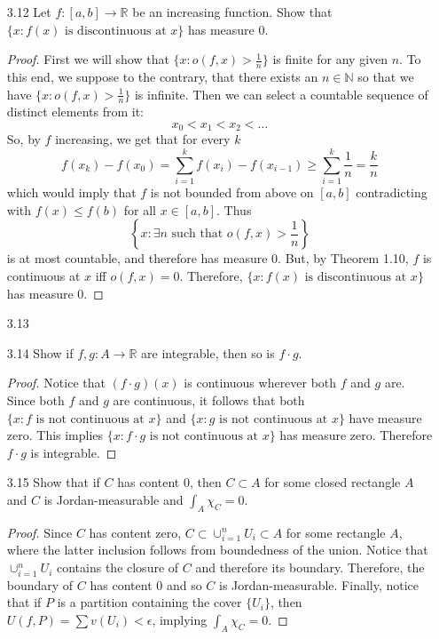 \begin{enumerate}
    \item[3.12] Let \( f:[a,b] \rightarrow \mathbb{R} \) be an increasing function. Show that \( \{x: f(x) \text{ is discontinuous at }x\} \) has measure \( 0 \).
    \begin{proof}
    First we will show that \( \{x: o(f,x) > \frac{1}{n} \} \) is finite for any given \( n \). To this end, we suppose to the contrary, that there exists an \( n \in \mathbb{N} \) so that we have \( \{x: o(f,x) > \frac{1}{n} \} \) is infinite. Then we can select a countable sequence of distinct elements from it: 
    \[
    x_0 < x_1 < x_2 < \ldots
    \]
    So, by \( f \) increasing, we get that for every \( k \)
    \[
    f(x_k)-f(x_0) = \sum_{i=1}^k f(x_i)-f(x_{i-1}) \geq \sum_{i=1}^k \frac{1}{n} = \frac{k}{n}
    \]
    which would imply that \( f \) is not bounded from above on \( [a,b] \) contradicting with \( f(x) \leq f(b) \) for all \( x \in [a,b] \). Thus
    \[
    \left\{ x: \exists n \text{ such that } o(f,x) > \frac{1}{n} \right\}
    \]
    is at most countable, and therefore has measure \( 0 \). But, by Theorem 1.10, \( f \) is continuous at \( x \) iff \( o(f,x) = 0 \). Therefore, \( \{x: f(x) \text{ is discontinuous at }x\} \) has measure \( 0 \).
    \end{proof}
    
    \item[3.13]
    
    \item[3.14] Show if \( f,g:A \rightarrow \mathbb{R} \) are integrable, then so is \( f\cdot g \).
    \begin{proof}
    Notice that \( (f \cdot g)(x) \) is continuous wherever both \( f \) and \( g \) are. Since both \( f \) and \( g \) are continuous, it follows that both \( \{ x: f \text{ is not continuous at } x \} \) and \( \{ x: g \text{ is not continuous at } x \} \) have measure zero. This implies
    \( \{ x: f\cdot g \text{ is not continuous at } x \} \) has measure zero. Therefore \( f \cdot g \) is integrable.
    \end{proof}
    
    \item[3.15] Show that if \( C \) has content \( 0 \), then \( C \subset A \) for some closed rectangle \( A \) and \( C \) is Jordan-measurable and \( \int_A \chi_C = 0 \).
    \begin{proof}
    Since \( C \) has content zero, \( C \subset \cup_{i=1}^n U_i \subset A \) for some rectangle \( A \), where the latter inclusion follows from boundedness of the union. Notice that \( \cup_{i=1}^n U_i \) contains the closure of \( C \) and therefore its boundary. Therefore, the boundary of \( C \) has content \( 0 \) and so \( C \) is Jordan-measurable. Finally, notice that if \( P \) is a partition containing the cover \( \{U_i\} \), then \( U(f,P) = \sum v(U_i) < \epsilon \), implying \( \int_A \chi_C = 0 \).
    \end{proof}
    

\end{enumerate}
